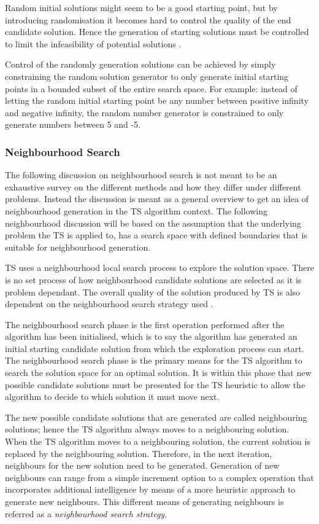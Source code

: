 Random initial solutions might seem to be a good starting point, but by introducing randomisation it becomes hard to control the quality of the end candidate solution\cite{TSHazardous}. Hence the generation of starting solutions must be controlled to limit the infeasibility of potential solutions \cite{TSHazardous}. 

Control of the randomly generation solutions can be achieved by simply constraining the random solution generator to only generate initial starting points in a bounded subset of the entire search space. For example: instead of letting the random initial starting point be any number between positive infinity and negative infinity, the random number generator is constrained to only generate numbers between 5 and -5.

\subsubsection{Neighbourhood Search}
The following discussion on neighbourhood search is not meant to be an exhaustive survey on the different methods and how they differ under different problems. Instead the discussion is meant as a general overview to get an idea of neighbourhood generation in the \gls{TS} algorithm context. The following neighbourhood discussion will be based on the assumption that the underlying problem the \gls{TS} is applied to, has a search space with defined boundaries that is suitable for neighbourhood generation.

TS uses a neighbourhood local search process to explore the solution space. There is no set process of how neighbourhood candidate solutions are selected as it is problem dependant. The overall quality of the solution produced by \gls{TS} is also dependent on the neighbourhood search strategy used \cite{TSHazardous}. 

The neighbourhood search phase is the first operation performed after the algorithm has been initialised, which is to say the algorithm has generated an initial starting candidate solution from which the exploration process can start. The neighbourhood search phase is the primary means for the \gls{TS} algorithm to search the solution space for an optimal solution. It is within this phase that new possible candidate solutions must be presented for the \gls{TS} heuristic to allow the algorithm to decide to which solution it must move next.

The new possible candidate solutions that are generated are called neighbouring solutions; hence the \gls{TS} algorithm always moves to a neighbouring solution. When the \gls{TS} algorithm moves to a neighbouring solution, the current solution is replaced by the neighbouring solution. Therefore, in the next iteration, neighbours for the new solution need to be generated. Generation of new neighbours can range from a simple increment option to a complex operation that incorporates additional intelligence by means of a more heuristic approach to generate new neighbours. This different means of generating neighbours is referred as a \emph{neighbourhood search strategy}.

